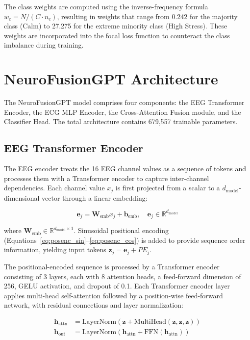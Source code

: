 \documentclass[12pt,letterpaper]{report}
\begin{document}
The class weights are computed using the inverse-frequency formula $w_c = N / (C \cdot n_c)$, resulting in weights that range from 0.242 for the majority class (Calm) to 27.275 for the extreme minority class (High Stress). These weights are incorporated into the focal loss function to counteract the class imbalance during training.

\section{NeuroFusionGPT Architecture}
\label{sec:architecture}

The NeuroFusionGPT model comprises four components: the EEG Transformer Encoder, the ECG MLP Encoder, the Cross-Attention Fusion module, and the Classifier Head. The total architecture contains 679,557 trainable parameters.

\subsection{EEG Transformer Encoder}
\label{subsec:eeg_encoder}

The EEG encoder treats the 16 EEG channel values as a sequence of tokens and processes them with a Transformer encoder to capture inter-channel dependencies. Each channel value $x_j$ is first projected from a scalar to a $d_{\text{model}}$-dimensional vector through a linear embedding:

\begin{equation}
\label{eq:eeg_embed}
\mathbf{e}_j = \mathbf{W}_{\text{emb}} x_j + \mathbf{b}_{\text{emb}}, \quad \mathbf{e}_j \in \mathbb{R}^{d_{\text{model}}}
\end{equation}

\noindent where $\mathbf{W}_{\text{emb}} \in \mathbb{R}^{d_{\text{model}} \times 1}$. Sinusoidal positional encoding (Equations~\ref{eq:posenc_sin}--\ref{eq:posenc_cos}) is added to provide sequence order information, yielding input tokens $\mathbf{z}_j = \mathbf{e}_j + PE_j$.

The positional-encoded sequence is processed by a Transformer encoder consisting of 3 layers, each with 8 attention heads, a feed-forward dimension of 256, GELU activation, and dropout of 0.1. Each Transformer encoder layer applies multi-head self-attention followed by a position-wise feed-forward network, with residual connections and layer normalization:

\begin{align}
\label{eq:transformer_sa}
\mathbf{h}_{\text{attn}} &= \text{LayerNorm}(\mathbf{z} + \text{MultiHead}(\mathbf{z}, \mathbf{z}, \mathbf{z})) \\
\label{eq:transformer_ff}
\mathbf{h}_{\text{out}} &= \text{LayerNorm}(\mathbf{h}_{\text{attn}} + \text{FFN}(\mathbf{h}_{\text{attn}}))
\end{align}
\end{document}

